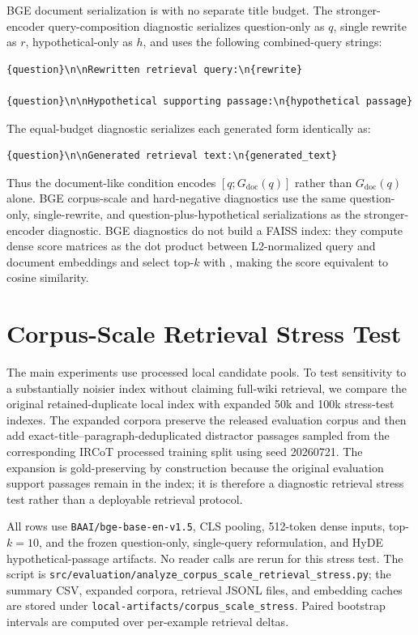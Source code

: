\documentclass[10pt]{article}
\begin{document}
BGE document serialization is  with no separate title budget. The stronger-encoder query-composition diagnostic serializes question-only as $q$, single rewrite as $r$, hypothetical-only as $h$, and uses the following combined-query strings:
\begingroup\footnotesize
\begin{verbatim}
{question}\n\nRewritten retrieval query:\n{rewrite}

{question}\n\nHypothetical supporting passage:\n{hypothetical passage}
\end{verbatim}
\endgroup
The equal-budget diagnostic serializes each generated form identically as:
\begingroup\footnotesize
\begin{verbatim}
{question}\n\nGenerated retrieval text:\n{generated_text}
\end{verbatim}
\endgroup
Thus the document-like condition encodes $[q;G_{\mathrm{doc}}(q)]$ rather than $G_{\mathrm{doc}}(q)$ alone. BGE corpus-scale and hard-negative diagnostics use the same question-only, single-rewrite, and question-plus-hypothetical serializations as the stronger-encoder diagnostic. BGE diagnostics do not build a FAISS index: they compute dense score matrices as the dot product between L2-normalized query and document embeddings and select top-$k$ with , making the score equivalent to cosine similarity.

\section{Corpus-Scale Retrieval Stress Test}
\label{sec:supp_corpus_scale_stress}

The main experiments use processed local candidate pools. To test sensitivity to a substantially noisier index without claiming full-wiki retrieval, we compare the original retained-duplicate local index with expanded 50k and 100k stress-test indexes. The expanded corpora preserve the released evaluation corpus and then add exact-title--paragraph-deduplicated distractor passages sampled from the corresponding IRCoT processed training split using seed 20260721. The expansion is gold-preserving by construction because the original evaluation support passages remain in the index; it is therefore a diagnostic retrieval stress test rather than a deployable retrieval protocol.

All rows use \texttt{BAAI/bge-base-en-v1.5}, CLS pooling, 512-token dense inputs, top-$k=10$, and the frozen question-only, single-query reformulation, and HyDE hypothetical-passage artifacts. No reader calls are rerun for this stress test. The script is \texttt{src/evaluation/analyze\_corpus\_scale\_retrieval\_stress.py}; the summary CSV, expanded corpora, retrieval JSONL files, and embedding caches are stored under \texttt{local-artifacts/corpus\_scale\_stress}. Paired bootstrap intervals are computed over per-example retrieval deltas.
\end{document}
